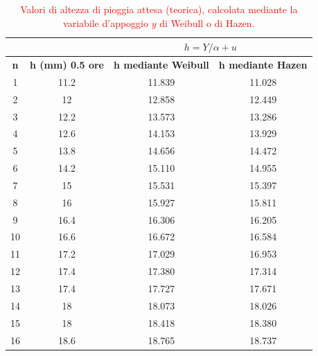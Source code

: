 \begin{table}[H] \centering
    \caption{\textcolor{red}{Valori di altezza di pioggia attesa (teorica), calcolata mediante la variabile d'appoggio $y$ di Weibull o di Hazen.}}
    \begin{tabular}{cccc}
 & & \multicolumn{2}{c}{$h = Y/\alpha + u$}       \\
 \toprule
    \textbf{n} & \textbf{h (mm)     0.5 ore} & \textbf{h mediante Weibull} & \textbf{h mediante Hazen} \\
\midrule
    1          & 11.2                        & 11.839                & 11.028                 \\
    2          & 12                          & 12.858                & 12.449                 \\
    3          & 12.2                        & 13.573                & 13.286                 \\
    4          & 12.6                        & 14.153                & 13.929                 \\
    5          & 13.8                        & 14.656                & 14.472                 \\
    6          & 14.2                        & 15.110                & 14.955                 \\
    7          & 15                          & 15.531                & 15.397                 \\
    8          & 16                          & 15.927                & 15.811                 \\
    9          & 16.4                        & 16.306                & 16.205                 \\
    10         & 16.6                        & 16.672                & 16.584                 \\
    11         & 17.2                        & 17.029                & 16.953                 \\
    12         & 17.4                        & 17.380                & 17.314                 \\
    13         & 17.4                        & 17.727                & 17.671                 \\
    14         & 18                          & 18.073                & 18.026                 \\
    15         & 18                          & 18.418                & 18.380                 \\
    16         & 18.6                        & 18.765                & 18.737                 \\

\end{tabular}
\end{table}
